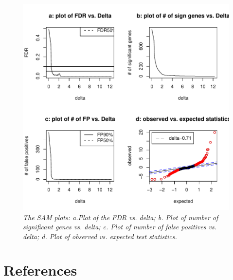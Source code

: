 \documentclass[10pt]{mybook4}
\begin{document}
\begin{figure}[!h]
\centering
\includegraphics[width=1\textwidth]{IsoGene-IsoSAMPlotOutput.pdf}
\caption{\em {The SAM plots: a.Plot of the FDR vs. delta; b. Plot of number of significant genes vs. delta; c. Plot of
number of false positives vs. delta; d. Plot of observed vs. expected test statistics.}} 
\label{IsoBHPlot}
\end{figure}


\clearpage
\newpage


\section*{References}
\end{document}
